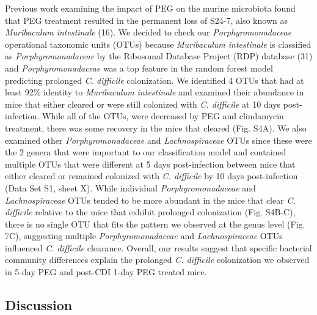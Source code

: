 \documentclass[
  11pt,
]{article}
\begin{document}
Previous work examining the impact of PEG on the murine microbiota found
that PEG treatment resulted in the permanent loss of S24-7, also known
as \emph{Muribaculum intestinale} (16). We decided to check our
\emph{Porphyromonadaceae} operational taxonomic units (OTUs) because
\emph{Muribaculum intestinale} is classified as
\emph{Porphyromonadaceae} by the Ribosomal Database Project (RDP)
database (31) and \emph{Porphyromonadaceae} was a top feature in the
random forest model predicting prolonged \emph{C. difficile}
colonization. We identified 4 OTUs that had at least 92\% identity to
\emph{Muribaculum intestinale} and examined their abundance in mice that
either cleared or were still colonized with \emph{C. difficile} at 10
days post-infection. While all of the OTUs, were decreased by PEG and
clindamycin treatment, there was some recovery in the mice that cleared
(Fig. S4A). We also examined other \emph{Porphyromonadaceae} and
\emph{Lachnospiraceae} OTUs since these were the 2 genera that were
important to our classification model and contained multiple OTUs that
were different at 5 days post-infection between mice that either cleared
or remained colonized with \emph{C. difficile} by 10 days post-infection
(Data Set S1, sheet X). While individual \emph{Porphyromonadaceae} and
\emph{Lachnospiraceae} OTUs tended to be more abundant in the mice that
clear \emph{C. difficile} relative to the mice that exhibit prolonged
colonization (Fig. S4B-C), there is no single OTU that fits the pattern
we observed at the genus level (Fig. 7C), suggesting multiple
\emph{Porphyromonadaceae} and \emph{Lachnospiraceae} OTUs influenced
\emph{C. difficile} clearance. Overall, our results suggest that
specific bacterial community differences explain the prolonged \emph{C.
difficile} colonization we observed in 5-day PEG and post-CDI 1-day PEG
treated mice.

\hypertarget{discussion}{%
\subsection{Discussion}\label{discussion}}
\end{document}
